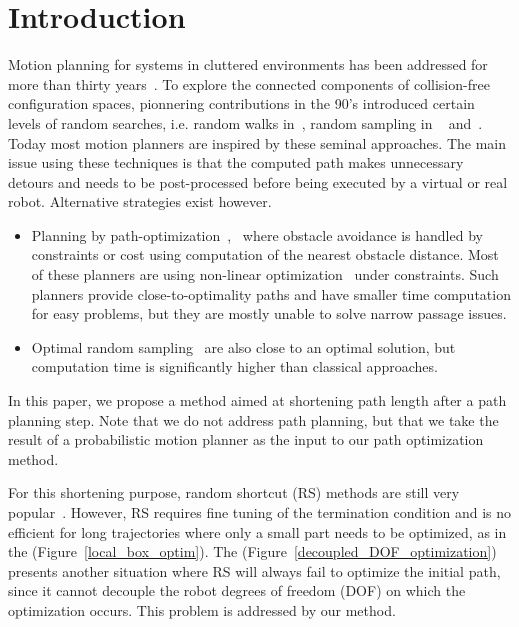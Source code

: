 \documentclass{tADR2e}
\begin{document}
\section{Introduction}
Motion planning for systems in cluttered environments has been addressed for more
than thirty years~\cite{ref-motionplan}. 
To explore the connected components of collision-free configuration spaces, pionnering contributions in the 90’s introduced certain levels of random searches, i.e. random walks in~\cite{potentielBarraquandLatombe}, random sampling in 
~\cite{KavrakiLatombePRM} and~\cite{LaValleKuffnerRRT}. Today most motion planners are inspired by these seminal approaches.
The main issue using these techniques is that the computed path makes unnecessary 
detours and needs to be post-processed before being executed by a virtual or real 
robot. Alternative strategies exist however.
\begin{itemize}
\item Planning by path-optimization~\cite{itomp2012},~\cite{voronoiOMP} where
obstacle avoidance is handled by constraints or cost using computation of the
nearest obstacle distance. Most of these planners are using non-linear
optimization~\cite{BettsNonlinopt} under constraints. Such planners provide close-to-optimality paths and have smaller time computation
for easy problems, but they are mostly unable to solve narrow passage issues.
 
\item Optimal random sampling~\cite{KaramanPRMstarRRTstar} are also close to an
optimal solution, but computation time is significantly higher than classical
approaches.
\end{itemize}

In this paper, we propose a method aimed at shortening path length after a path
planning step. Note that we do not address path planning, but that we take the
result of a probabilistic motion planner as the input to our path optimization 
method.

For this shortening purpose, random shortcut (RS) methods are
still very 
popular~\cite{Sekhavat-Svestka1998,Geraerts04clearancebased,HauserFastSmooth}. 
However, RS requires fine 
tuning of the termination condition and is no efficient for long 
trajectories where only a small part needs to be optimized, 
as in the (Figure~\ref{local_box_optim}). 
The (Figure~\ref{decoupled_DOF_optimization}) presents another situation where RS 
will always fail to optimize the initial path, since it cannot decouple the 
robot degrees of freedom (DOF) on which the optimization occurs. This problem is 
addressed by our method.
\end{document}
